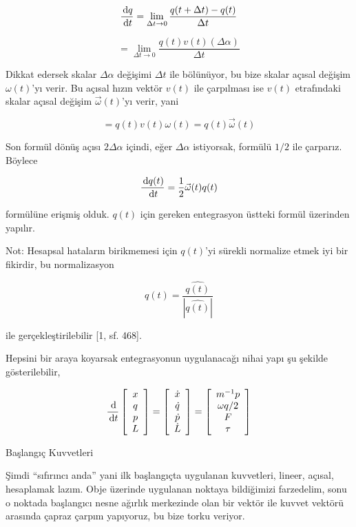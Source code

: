\documentclass[12pt,fleqn]{article}\usepackage{../../common}
\begin{document}
$$
\frac{\,\mathrm{d} q}{\,\mathrm{d} t} = \lim_{\Delta t \to 0} \frac{q(t + \Delta t) - q(t)}{\Delta t}
$$

$$
= \lim_{\Delta t \to 0} \frac{q(t) v(t) (\Delta \alpha)}{\Delta t}
$$

Dikkat edersek skalar $\Delta \alpha$ değişimi $\Delta t$ ile bölünüyor, bu bize
skalar açısal değişim $\omega(t)$'yı verir. Bu açısal hızın vektör $v(t)$ ile
çarpılması ise $v(t)$ etrafındaki skalar açısal değişim $\vec{\omega}(t)$'yı
verir, yani

$$
= q(t) v(t) \omega(t) = q(t) \vec{\omega}(t)
$$

Son formül dönüş açısı $2 \Delta \alpha$ içindi, eğer $\Delta \alpha$
istiyorsak, formülü $1/2$ ile çarparız. Böylece 

$$
\frac{\,\mathrm{d} q(t)}{\,\mathrm{d} t} = \frac{1}{2} \vec{\omega}(t) q(t)
$$

formülüne erişmiş olduk. $q(t)$ için gereken entegrasyon üstteki formül
üzerinden yapılır.

Not: Hesapsal hataların birikmemesi için $q(t)$'yi sürekli normalize etmek
iyi bir fikirdir, bu normalizasyon

$$
q(t) = \frac{\hat{q(t)}}{|\hat{q(t)}|}
$$

ile gerçekleştirilebilir [1, sf. 468].

Hepsini bir araya koyarsak entegrasyonun uygulanacağı nihai yapı şu şekilde
gösterilebilir,

$$
\frac{\,\mathrm{d}}{\,\mathrm{d} t}
\left[\begin{array}{c}
x \\ q \\ p  \\ L
\end{array}\right] =
\left[\begin{array}{c}
\dot{x} \\ \dot{q} \\ \dot{p}  \\ \dot{L}
\end{array}\right] =
\left[\begin{array}{ccc}
m^{-1} p \\ \omega q / 2 \\ F \\ \tau
\end{array}\right]
$$

Başlangıç Kuvvetleri

Şimdi ``sıfırıncı anda'' yani ilk başlangıçta uygulanan kuvvetleri, lineer,
açısal, hesaplamak lazım. Obje üzerinde uygulanan noktaya bildiğimizi
farzedelim, sonu o noktada başlangıcı nesne ağırlık merkezinde olan bir vektör
ile kuvvet vektörü arasında çapraz çarpım yapıyoruz, bu bize torku veriyor.
\end{document}
